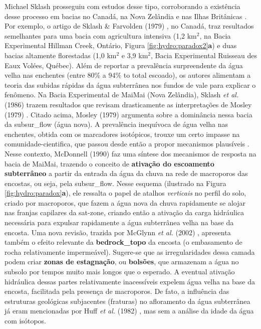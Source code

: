 \documentclass[./main.tex]{subfiles}
\begin{document}
\noindent Michael Sklash prosseguiu com estudos desse tipo, corroborando a existência desse processo em bacias no Canadá, na Nova Zelândia e nas Ilhas Britânicas \cite{sklash1979, sklash1986, sklash1996}. Por exemplo, o artigo de Sklash \& Farvolden (1979) \cite{sklash1979}, no Canadá, traz resultados semelhantes para uma bacia com agricultura intensiva (1,2 km$^2$, na Bacia Experimental Hillman Creek, Ontário, Figura \ref{fig:hydro:paradox2}\textbf{a}) e duas bacias altamente florestadas (1,0 km$^2$ e 3,9 km$^2$, Bacia Experimental Ruisseau des Eaux Volées, Québec). Além de reportar a prevalência surpreendente da água velha nas enchentes (entre 80\% a 94\% to total escoado), os autores alimentam a \gls{teoria} das subidas rápidas da água subterrânea nos fundos de vale para explicar o fenômeno. Na Bacia Experimental de MaiMai (Nova Zelândia), Sklash \textit{et al.} (1986) \cite{sklash1986} trazem resultados que revisam drasticamente as interpretações de Mosley (1979) \cite{Mosley1979}. Citado acima, Mosley (1979) argumenta sobre a dominância nessa bacia da \gls{subsur_flow} (água nova). A prevalência inequívoca de água velha nas enchentes, obtida com os marcadores isotópicos, trouxe um certo impasse na \gls{comunidade-cientifica}, que passou desde então a propor mecanismos plausíveis \cite{buttle1994}. Nesse contexto, McDonnell (1990) \cite{mcdonnell1990} faz uma síntese dos mecanismos de resposta na bacia de MaiMai, trazendo o conceito de \textbf{ativação do escoamento subterrâneo} a partir da entrada da água da chuva na rede de macroporos das encostas, ou seja, pela \gls{subsur_flow}. Nesse esquema (ilustrado na Figura \ref{fig:hydro:paradox}\textbf{a}), ele ressalta o papel de atalhos \textit{verticais} no perfil do solo, criado por macroporos, que fazem a água nova da chuva rapidamente se alojar nas franjas capilares da \gls{sat-zone}, criando então a ativação da carga hidráulica necessária para expulsar rapidamente a água subterrânea velha na base da encosta. Uma nova revisão, trazida por McGlynn \textit{et al.} (2002) \cite{mcglynn2002}, apresenta também o efeito relevante da \textbf{\gls{bedrock_topo}} da encosta (o embasamento de rocha relativamente impermeável). Sugere-se que as irregularidades dessa camada podem criar \textbf{zonas de estagnação}, ou \textbf{bolsões}, que armazenam a água no subsolo por tempos muito mais longos que o esperado. A eventual ativação hidráulica dessas partes relativamente inacessíveis expelem água velha na base da encosta, facilitada pela presença de macroporos. De fato, a influência das estruturas geológicas subjacentes (fraturas) no afloramento da água subterrânea já eram mencionadas por Huff \textit{et al.} (1982) \cite{Huff1982}, mas sem a análise da idade da água com isótopos.
\end{document}

